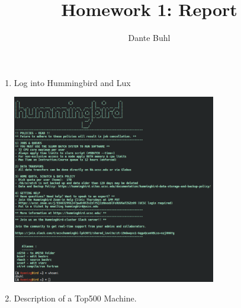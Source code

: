 \documentclass{article}
\title{Homework 1: Report}
\author{Dante Buhl}
\begin{document}
\newcommand{\bs}[1]{\boldsymbol{#1}}
\newcommand{\bmp}[1]{\begin{minipage}{#1\textwidth}}
\newcommand{\emp}{\end{minipage}}
\newcommand{\R}{\mathbb{R}}
\newcommand{\C}{\mathbb{C}}
\newcommand{\N}{\mathcal{N}}
\newcommand{\I}{\mathrm{I}}
\newcommand{\K}{\bs{\mathrm{K}}}
\newcommand{\m}{\bs{\mu}_*}
\newcommand{\s}{\bs{\Sigma}_*}
\newcommand{\dt}{\Delta t}
\newcommand{\tr}[1]{\text{Tr}(#1)}
\newcommand{\Tr}[1]{\text{Tr}(#1)}

\maketitle



\begin{enumerate}
    
\item Log into Hummingbird and Lux

\begin{center}

    \includegraphics[width=0.7\textwidth]{../hummingbird.png}

\end{center}
 
\item Description of a Top500 Machine. 


\end{enumerate}
\end{document}
